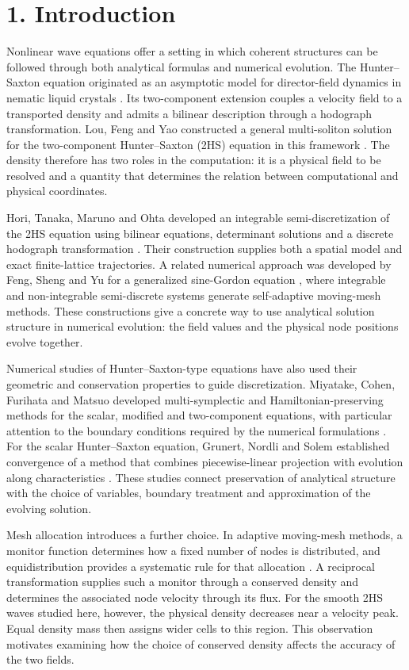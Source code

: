 \documentclass[11pt,a4paper]{article}
\begin{document}
\section*{1. Introduction}

Nonlinear wave equations offer a setting in which coherent structures can be followed through both analytical formulas and numerical evolution. The Hunter--Saxton equation originated as an asymptotic model for director-field dynamics in nematic liquid crystals \cite{hunter1991}. Its two-component extension couples a velocity field to a transported density and admits a bilinear description through a hodograph transformation. Lou, Feng and Yao constructed a general multi-soliton solution for the two-component Hunter--Saxton (2HS) equation in this framework \cite{lou2016}. The density therefore has two roles in the computation: it is a physical field to be resolved and a quantity that determines the relation between computational and physical coordinates.

Hori, Tanaka, Maruno and Ohta developed an integrable semi-discretization of the 2HS equation using bilinear equations, determinant solutions and a discrete hodograph transformation \cite{hori2026}. Their construction supplies both a spatial model and exact finite-lattice trajectories. A related numerical approach was developed by Feng, Sheng and Yu for a generalized sine-Gordon equation \cite{feng2023}, where integrable and non-integrable semi-discrete systems generate self-adaptive moving-mesh methods. These constructions give a concrete way to use analytical solution structure in numerical evolution: the field values and the physical node positions evolve together.

Numerical studies of Hunter--Saxton-type equations have also used their geometric and conservation properties to guide discretization. Miyatake, Cohen, Furihata and Matsuo developed multi-symplectic and Hamiltonian-preserving methods for the scalar, modified and two-component equations, with particular attention to the boundary conditions required by the numerical formulations \cite{miyatake2017}. For the scalar Hunter--Saxton equation, Grunert, Nordli and Solem established convergence of a method that combines piecewise-linear projection with evolution along characteristics \cite{grunert2021}. These studies connect preservation of analytical structure with the choice of variables, boundary treatment and approximation of the evolving solution.

Mesh allocation introduces a further choice. In adaptive moving-mesh methods, a monitor function determines how a fixed number of nodes is distributed, and equidistribution provides a systematic rule for that allocation \cite{huang2011}. A reciprocal transformation supplies such a monitor through a conserved density and determines the associated node velocity through its flux. For the smooth 2HS waves studied here, however, the physical density decreases near a velocity peak. Equal density mass then assigns wider cells to this region. This observation motivates examining how the choice of conserved density affects the accuracy of the two fields.
\end{document}
